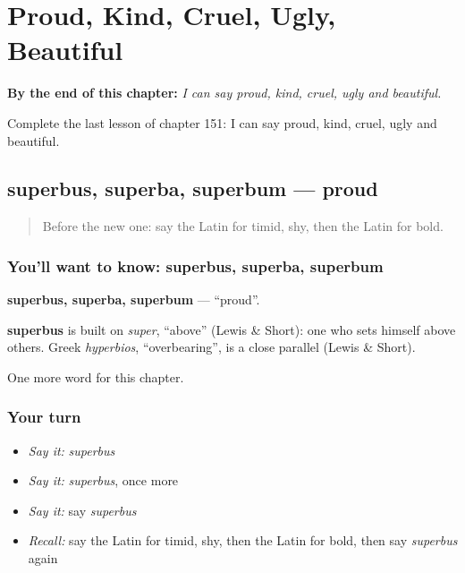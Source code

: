 
\chapter{Proud, Kind, Cruel, Ugly, Beautiful}
\label{ch:la-proud-kind-cruel-ugly-beautiful}

\begin{chapteropening}
\textbf{By the end of this chapter:} \emph{I can say proud, kind, cruel, ugly and beautiful.}

Complete the last lesson of chapter 151: I can say proud, kind, cruel, ugly and beautiful.
\end{chapteropening}

\section[superbus, superba, superbum]{superbus, superba, superbum — proud}

\label{lesson:LA-C151-superbus}



\begin{quote}
Before the new one: say the Latin for timid, shy, then the Latin for bold.
\end{quote}

\subsection*{You'll want to know: superbus, superba, superbum}
\textbf{superbus, superba, superbum} — \textquotedblleft{}proud\textquotedblright{}.

\begin{cousinweb}
\textbf{superbus} is built on \emph{super}, \textquotedblleft{}above\textquotedblright{} (Lewis \& Short): one who sets himself above others. Greek \emph{hyperbios}, \textquotedblleft{}overbearing\textquotedblright{}, is a close parallel (Lewis \& Short).
\end{cousinweb}

\begin{grammarlens}[title={What you've built}]
One more word for this chapter.
\end{grammarlens}

\subsection*{Your turn}
\begin{itemize}
\raggedright
  \item \emph{Say it:} \emph{superbus}
  \item \emph{Say it:} \emph{superbus}, once more
  \item \emph{Say it:} say \emph{superbus}
  \item \emph{Recall:} say the Latin for timid, shy, then the Latin for bold, then say \emph{superbus} again
\end{itemize}

